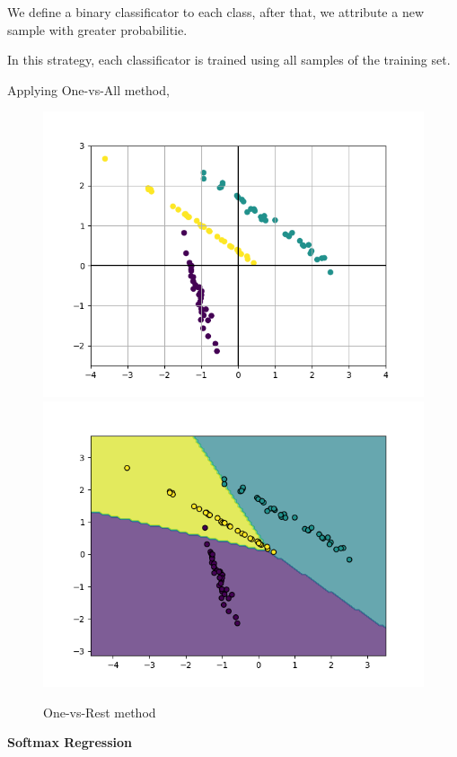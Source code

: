 \documentclass[a4paper, 11pt]{article}
\begin{document}
We define a binary classificator to each class, after that, we attribute a new sample with greater probabilitie.

In this strategy, each classificator is trained using all samples of the training set.

Applying One-vs-All method, 
\begin{figure}[H]
        \centering
        \includegraphics[scale=0.5]{test.png}
        \includegraphics[scale=0.5]{OnevsAll.png}

        \caption{One-vs-Rest method}
\end{figure}


{\Large\textbf{Softmax Regression}}
\end{document}
